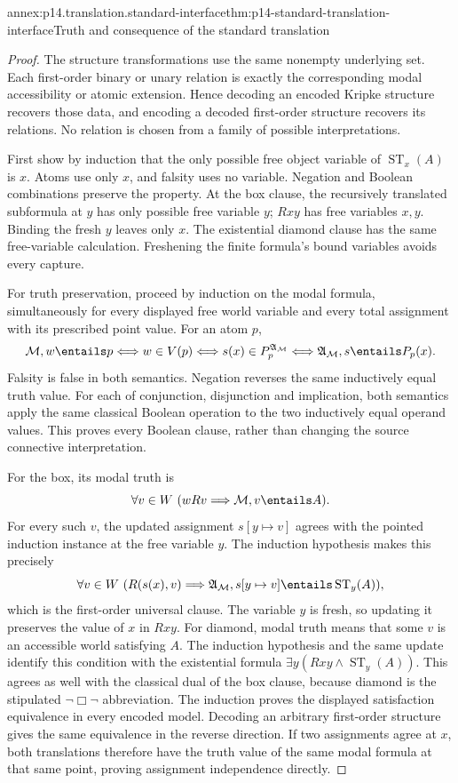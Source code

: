 \begin{annexitem}{annex:p14.translation.standard-interface}{thm:p14-standard-translation-interface}{Truth and consequence of the standard translation}
\begin{proof}
The structure transformations use the same nonempty underlying set. Each
first-order binary or unary relation is exactly the corresponding modal
accessibility or atomic extension. Hence decoding an encoded Kripke structure
recovers those data, and encoding a decoded first-order structure recovers
its relations. No relation is chosen from a family of possible interpretations.

First show by induction that the only possible free object variable of
\(\operatorname{ST}_x(A)\) is \(x\). Atoms use only \(x\), and falsity
uses no variable. Negation and Boolean combinations preserve the property.
At the box clause, the recursively translated subformula at \(y\) has
only possible free variable \(y\); \(Rxy\) has free variables \(x,y\).
Binding the fresh \(y\) leaves only \(x\). The existential diamond
clause has the same free-variable calculation. Freshening the finite
formula's bound variables avoids every capture.

For truth preservation, proceed by induction on the modal formula,
simultaneously for every displayed free world variable and every total
assignment with its prescribed point value.
For an atom \(p\),
\[
 \mathcal M,w\entails p
 \Longleftrightarrow w\in V(p)
 \Longleftrightarrow s(x)\in P_p^{\mathfrak A_{\mathcal M}}
 \Longleftrightarrow\mathfrak A_{\mathcal M},s\entails P_p(x).
\]
Falsity is false in both semantics. Negation reverses the same inductively
equal truth value. For each of conjunction, disjunction and implication,
both semantics apply the same classical Boolean operation to the two
inductively equal operand values. This proves every Boolean clause, rather
than changing the source connective interpretation.

For the box, its modal truth is
\[
 \forall v\in W\ (wRv\Longrightarrow\mathcal M,v\entails A).
\]
For every such \(v\), the updated assignment \(s[y\mapsto v]\)
agrees with the pointed induction instance at the free variable \(y\).
The induction hypothesis makes this precisely
\[
 \forall v\in W\ (R(s(x),v)\Longrightarrow
       \mathfrak A_{\mathcal M},s[y\mapsto v]
                            \entails\operatorname{ST}_y(A)),
\]
which is the first-order universal clause. The variable \(y\) is fresh,
so updating it preserves the value of \(x\) in \(Rxy\). For diamond,
modal truth means that some \(v\) is an accessible world satisfying
\(A\). The induction hypothesis and the same update identify this
condition with the existential formula
\(\exists y(Rxy\land\operatorname{ST}_y(A))\).
This agrees as well with the classical dual of the box clause, because
diamond is the stipulated \(\neg\Box\neg\) abbreviation. The induction
proves the displayed satisfaction equivalence in every encoded model.
Decoding an arbitrary first-order structure gives the same equivalence
in the reverse direction. If two assignments agree at \(x\), both
translations therefore have the truth value of the same modal formula
at that same point, proving assignment independence directly.


\end{proof}
\end{annexitem}
